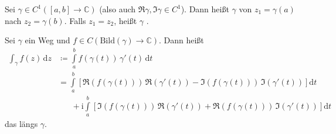 \begin{theorem}[Definition]
  \begin{enum-arab}
    \item Sei $\gamma \in C^1([a,b] \to \mathbb{C})$ (also auch $\Re \gamma, \Im \gamma \in C^1$). Dann heißt $\gamma$  von $z_1 = \gamma(a)$ nach $z_2 = \gamma(b)$. Falls $z_1 = z_2$, heißt $\gamma$ .
    
    \item Sei $\gamma$ ein Weg und $f \in C(\mathrm{Bild}(\gamma) \to \mathbb{C})$. Dann heißt
    \begin{align*}
      \int_\gamma f(z) \, \mathrm{d}z &\coloneq \int\limits_{a}^{b} f(\gamma(t)) \, \gamma'(t) \, \mathrm{d}t \\
      &= \int\limits_{a}^{b} \left[ \Re(f(\gamma(t))) \, \Re(\gamma'(t)) - \Im(f(\gamma(t))) \, \Im(\gamma'(t)) \right] \mathrm{d}t \\
      &\phantom{=\;} + \mathrm{i} \int\limits_{a}^{b} \left[ \Im(f(\gamma(t))) \, \Re(\gamma'(t)) + \Re(f(\gamma(t))) \, \Im(\gamma'(t)) \right] \mathrm{d}t
    \end{align*}
    das  längs $\gamma$.
  \end{enum-arab}
\end{theorem}

